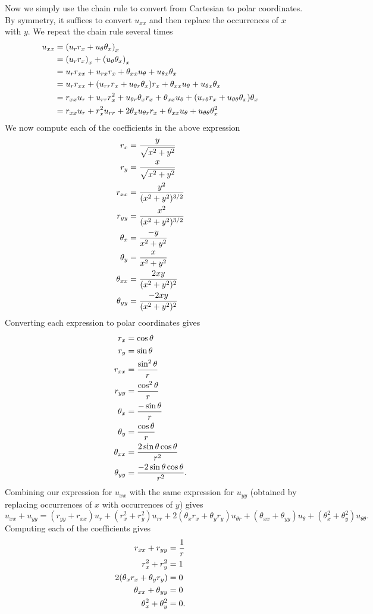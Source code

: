 \documentclass[12pt,letterpaper,boxed]{jhwhw}
\newcommand{\lrparen}[1]{{\left( #1 \right)}}
\begin{document}
Now we simply use the chain rule to convert from Cartesian to polar coordinates. By symmetry, it suffices to convert $u_{xx}$ and then replace the occurrences of $x$ with $y$.
We repeat the chain rule several times
\[
	\begin{aligned}
		u_{xx} &= \lrparen{ u_r r_x + u_\theta \theta_x }_x \cr
        		&= \lrparen{u_r r_x }_x + \lrparen{ u_\theta \theta_x }_x \cr
		       &= u_r r_{xx} + u_{rx} r_x + \theta_{xx} u_\theta + u_{\theta x} \theta_x \cr
		       &=  u_r r_{xx} + \lrparen{ u_{rr} r_x + u_{\theta r} \theta_x } r_x + \theta_{xx} u_\theta + u_{\theta x} \theta_x \cr
		       &=  r_{xx} u_r + u_{rr} r_x^2 + u_{\theta r} \theta_x r_x + \theta_{xx} u_\theta + \lrparen{ u_{r \theta} r_x + u_{\theta \theta} \theta_x } \theta_x \cr
		       &= r_{xx} u_r + r_x^2 u_{rr} + 2 \theta_x u_{\theta r} r_x + \theta_{xx} u_\theta + u_{\theta \theta} \theta_x^2
	\end{aligned}
\]
We now compute each of the coefficients in the above expression
\[
	\begin{aligned}
		r_x &= \frac{y}{\sqrt{x^2 + y^2}} \cr
		r_y &= \frac{x}{\sqrt{x^2 + y^2}} \cr
		r_{xx} &= \frac{y^2}{(x^2 + y^2)^{3/2}} \cr
		r_{yy} &= \frac{x^2}{(x^2 + y^2)^{3/2}} \cr
		\theta_x &= \frac{-y}{x^2 + y^2} \cr
		\theta_y &= \frac{x}{x^2 + y^2} \cr
		\theta_{xx} &= \frac{2xy}{(x^2 + y^2)^2} \cr
		\theta_{yy} &= \frac{-2xy}{(x^2 + y^2)^2}
	\end{aligned}
\]
Converting each expression to polar coordinates gives
\[
	\begin{aligned}
		r_x &= \cos \theta \cr
		r_y &= \sin \theta \cr
		r_{xx} &= \frac{\sin^2 \theta}{r} \cr
		r_{yy} &= \frac{\cos^2 \theta}{r} \cr
		\theta_x &= \frac{-\sin \theta}{r} \cr
		\theta_y &= \frac{\cos \theta}{r} \cr
		\theta_{xx} &= \frac{2 \sin \theta \cos \theta}{r^2} \cr
		\theta_{yy} &= \frac{-2 \sin \theta \cos \theta}{r^2}.
	\end{aligned}
\]
Combining our expression for $u_{xx}$ with the same expression for $u_{yy}$ (obtained by replacing occurrences of $x$ with occurrences of $y$) gives
\[
	u_{xx} + u_{yy} = (r_{yy} + r_{xx}) u_r + (r_x^2 + r_y^2) u_{rr} + 2(\theta_x r_x + \theta_y r_y) u_{\theta r} + (\theta_{xx} + \theta_{yy}) u_\theta + (\theta_x^2 + \theta_y^2) u_{\theta \theta}.
\]
Computing each of the coefficients gives
\[
	\begin{aligned}
		r_{xx} + r_{yy} &= \frac{1}{r} \cr
		r_x^2 + r_y^2 &= 1 \cr
		2(\theta_x r_x + \theta_y r_y) &= 0 \cr
		\theta_{xx} + \theta_{yy} &= 0 \cr
		\theta_x^2 + \theta_y^2 &= 0.
	\end{aligned}
\]
\end{document}
